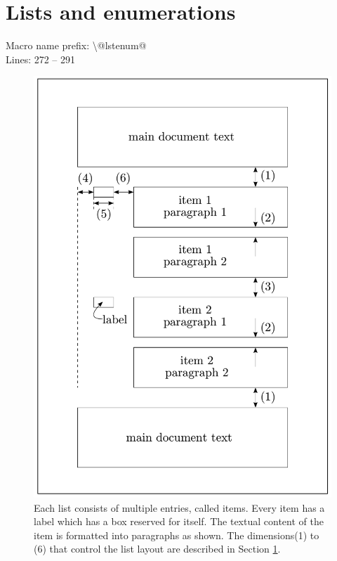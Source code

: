 \documentclass[twoside,openany]{thesis}
\begin{document}
\clearpage

\section{Lists and enumerations}\label{sec:Lists and enumerations}

Macro name prefix: {\ttfamily\textbackslash @lstenum@}\\
Lines: 272 -- 291

\begin{figure}
    \begin{center}
        \includegraphics[scale=0.35]{lstenum.pdf}
    \end{center}
    \caption[List layout dimensions]{
        Each list consists of multiple entries, called items.
        Every item has a label which has a box reserved for itself.
        The textual content of the item is formatted into paragraphs as shown.
        The dimensions(1) to (6) that control the list layout are described in Section \ref{sec:Lists and enumerations}.
    }
    \label{fig:List layout dimensions}
\end{figure}
\end{document}

